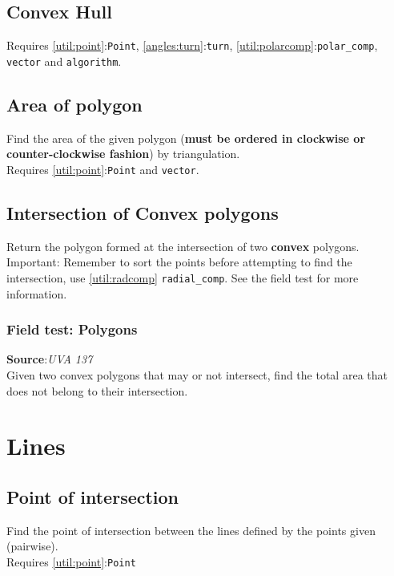\documentclass[11pt, oneside]{article}   	%
\begin{document}
\subsection{Convex Hull}
Requires \ref{util:point}:\verb|Point|, \ref{angles:turn}:\verb|turn|, \ref{util:polarcomp}:\verb|polar_comp|, \verb|vector| and \verb|algorithm|.

\subsection{Area of polygon}
Find the area of the given polygon (\textbf{must be ordered in clockwise or counter-clockwise fashion}) by triangulation. \\	
Requires \ref{util:point}:\verb|Point| and \verb|vector|.


\subsection{Intersection of Convex polygons}
Return the polygon formed at the intersection of two \textbf{convex} polygons. Important: Remember to sort the points before attempting to find the intersection, use \ref{util:radcomp} \verb|radial_comp|. See the field test for more information.


\subsubsection{Field test: Polygons }\label{poly_intersection:ex}
\textbf{Source}:\textit{UVA 137}\\
Given two convex polygons that may or not intersect, find the total area that does not belong to their intersection.

\label{poly_intersection:ex}

	
\section{Lines}
\subsection{Point of intersection}
Find the point of intersection between the lines defined by the points given (pairwise).\\
Requires \ref{util:point}:\verb|Point|
\end{document}
